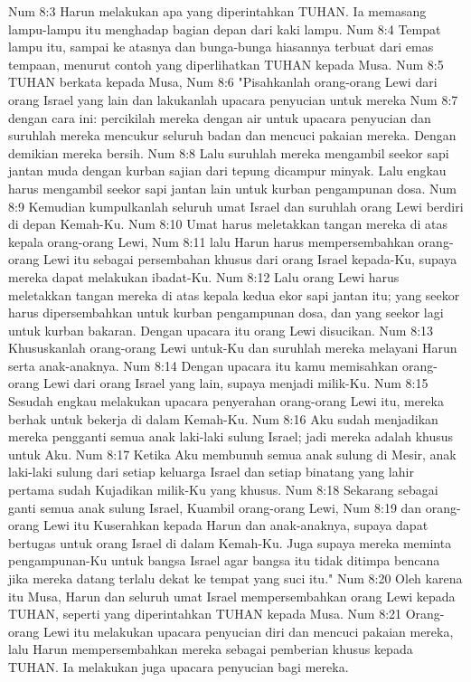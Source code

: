 Num 8:3  Harun melakukan apa yang diperintahkan TUHAN. Ia memasang lampu-lampu itu menghadap bagian depan dari kaki lampu.
Num 8:4  Tempat lampu itu, sampai ke atasnya dan bunga-bunga hiasannya terbuat dari emas tempaan, menurut contoh yang diperlihatkan TUHAN kepada Musa.
Num 8:5  TUHAN berkata kepada Musa,
Num 8:6  "Pisahkanlah orang-orang Lewi dari orang Israel yang lain dan lakukanlah upacara penyucian untuk mereka
Num 8:7  dengan cara ini: percikilah mereka dengan air untuk upacara penyucian dan suruhlah mereka mencukur seluruh badan dan mencuci pakaian mereka. Dengan demikian mereka bersih.
Num 8:8  Lalu suruhlah mereka mengambil seekor sapi jantan muda dengan kurban sajian dari tepung dicampur minyak. Lalu engkau harus mengambil seekor sapi jantan lain untuk kurban pengampunan dosa.
Num 8:9  Kemudian kumpulkanlah seluruh umat Israel dan suruhlah orang Lewi berdiri di depan Kemah-Ku.
Num 8:10  Umat harus meletakkan tangan mereka di atas kepala orang-orang Lewi,
Num 8:11  lalu Harun harus mempersembahkan orang-orang Lewi itu sebagai persembahan khusus dari orang Israel kepada-Ku, supaya mereka dapat melakukan ibadat-Ku.
Num 8:12  Lalu orang Lewi harus meletakkan tangan mereka di atas kepala kedua ekor sapi jantan itu; yang seekor harus dipersembahkan untuk kurban pengampunan dosa, dan yang seekor lagi untuk kurban bakaran. Dengan upacara itu orang Lewi disucikan.
Num 8:13  Khususkanlah orang-orang Lewi untuk-Ku dan suruhlah mereka melayani Harun serta anak-anaknya.
Num 8:14  Dengan upacara itu kamu memisahkan orang-orang Lewi dari orang Israel yang lain, supaya menjadi milik-Ku.
Num 8:15  Sesudah engkau melakukan upacara penyerahan orang-orang Lewi itu, mereka berhak untuk bekerja di dalam Kemah-Ku.
Num 8:16  Aku sudah menjadikan mereka pengganti semua anak laki-laki sulung Israel; jadi mereka adalah khusus untuk Aku.
Num 8:17  Ketika Aku membunuh semua anak sulung di Mesir, anak laki-laki sulung dari setiap keluarga Israel dan setiap binatang yang lahir pertama sudah Kujadikan milik-Ku yang khusus.
Num 8:18  Sekarang sebagai ganti semua anak sulung Israel, Kuambil orang-orang Lewi,
Num 8:19  dan orang-orang Lewi itu Kuserahkan kepada Harun dan anak-anaknya, supaya dapat bertugas untuk orang Israel di dalam Kemah-Ku. Juga supaya mereka meminta pengampunan-Ku untuk bangsa Israel agar bangsa itu tidak ditimpa bencana jika mereka datang terlalu dekat ke tempat yang suci itu."
Num 8:20  Oleh karena itu Musa, Harun dan seluruh umat Israel mempersembahkan orang Lewi kepada TUHAN, seperti yang diperintahkan TUHAN kepada Musa.
Num 8:21  Orang-orang Lewi itu melakukan upacara penyucian diri dan mencuci pakaian mereka, lalu Harun mempersembahkan mereka sebagai pemberian khusus kepada TUHAN. Ia melakukan juga upacara penyucian bagi mereka.
